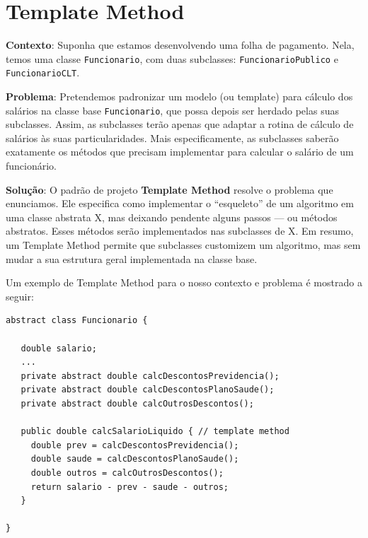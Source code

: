 \documentclass[
  11pt,
  twoside]{book}
\newcommand{\passthrough}[1]{#1}
\begin{document}
\hypertarget{template-method}{%
\section{Template Method}\label{template-method}}

 

\textbf{Contexto}: Suponha que estamos desenvolvendo uma folha de
pagamento. Nela, temos uma classe \passthrough{\lstinline!Funcionario!},
com duas subclasses: \passthrough{\lstinline!FuncionarioPublico!} e
\passthrough{\lstinline!FuncionarioCLT!}.

\textbf{Problema}: Pretendemos padronizar um modelo (ou template) para
cálculo dos salários na classe base
\passthrough{\lstinline!Funcionario!}, que possa depois ser herdado
pelas suas subclasses. Assim, as subclasses terão apenas que adaptar a
rotina de cálculo de salários às suas particularidades. Mais
especificamente, as subclasses saberão exatamente os métodos que
precisam implementar para calcular o salário de um funcionário.

\textbf{Solução}: O padrão de projeto \textbf{Template Method} resolve o
problema que enunciamos. Ele especifica como implementar o ``esqueleto''
de um algoritmo em uma classe abstrata X, mas deixando pendente alguns
passos --- ou métodos abstratos. Esses métodos serão implementados nas
subclasses de X. Em resumo, um Template Method permite que subclasses
customizem um algoritmo, mas sem mudar a sua estrutura geral
implementada na classe base.

Um exemplo de Template Method para o nosso contexto e problema é
mostrado a seguir:

\begin{lstlisting}
abstract class Funcionario {

   double salario;
   ...
   private abstract double calcDescontosPrevidencia();
   private abstract double calcDescontosPlanoSaude();
   private abstract double calcOutrosDescontos();

   public double calcSalarioLiquido { // template method
     double prev = calcDescontosPrevidencia();
     double saude = calcDescontosPlanoSaude();
     double outros = calcOutrosDescontos();
     return salario - prev - saude - outros;
   }

}
\end{lstlisting}
\end{document}
